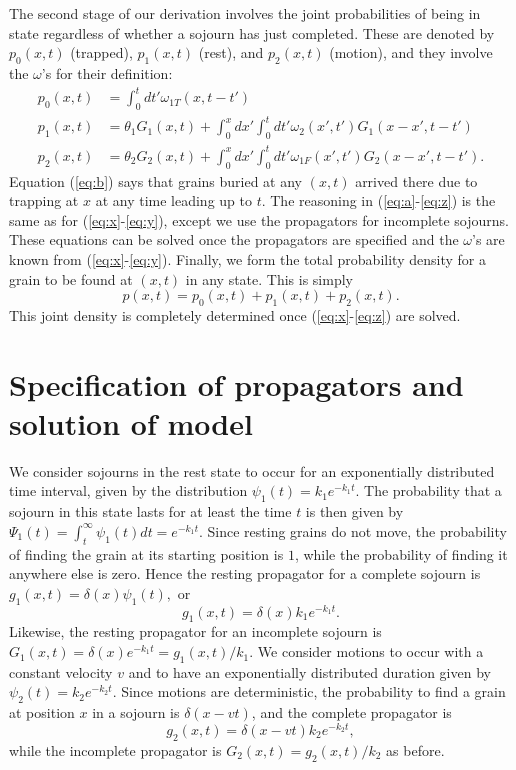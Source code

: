 \documentclass[]{agujournal2018}
\newcommand\be{\begin{equation}}
\newcommand\ee{\end{equation}}
\begin{document}
The second stage of our derivation involves the joint probabilities of being in state regardless of whether a sojourn has just completed. These are denoted by  $p_0(x,t)$ (trapped), $p_1(x,t)$ (rest), and $p_2(x,t)$ (motion), and they involve the $\omega$'s for their definition:
\begin{align}
p_0(x,t) &= \int_0^t dt' \omega_{1T}(x,t-t') \label{eq:b}\\
p_1(x,t) &= \theta_1 G_1(x,t) + \int_0^x dx' \int_0^t dt' \omega_2(x',t')G_1(x-x',t-t')\label{eq:a}\\
p_2(x,t) &= \theta_2 G_2(x,t) + \int_0^x dx' \int_0^t dt'  \omega_{1F}(x',t')G_2(x-x',t-t').\label{eq:z}
\end{align}
Equation (\ref{eq:b}) says that grains buried at any $(x,t)$ arrived there due to trapping at $x$ at any time leading up to $t$.
The reasoning in (\ref{eq:a}-\ref{eq:z}) is the same as for (\ref{eq:x}-\ref{eq:y}), except we use the propagators for incomplete sojourns.
These equations can be solved once the propagators are specified and the $\omega$'s are known from (\ref{eq:x}-\ref{eq:y}).
Finally, we form the total probability density for a grain to be found at $(x,t)$ in any state.
This is simply 
\be p(x,t) = p_0(x,t) + p_1(x,t) + p_2(x,t). \label{eq:dist}\ee
This joint density is completely determined once (\ref{eq:x}-\ref{eq:z}) are solved.


\section{Specification of propagators and solution of model}
\label{sec:solution}
We consider sojourns in the rest state to occur for an exponentially distributed time interval, given by the distribution $\psi_1(t) = k_1 e^{-k_1t}.$
The probability that a sojourn in this state lasts for at least the time $t$ is then given by $\Psi_1(t) = \int_t^\infty \psi_1(t)dt = e^{-k_1 t}$.
Since resting grains do not move, the probability of finding the grain at its starting position is $1$, while the probability of finding it anywhere else is zero.
Hence the resting propagator for a complete sojourn is $g_1(x,t) = \delta(x)\psi_1(t),$ or 
\be g_1(x,t) = \delta(x)k_1e^{-k_1t}.\label{eq:prop1} \ee
Likewise, the resting propagator for an incomplete sojourn is $G_1(x,t) = \delta(x)e^{-k_1t} = g_1(x,t)/k_1.$
We consider motions to occur with a constant velocity $v$ and to have an exponentially distributed duration given by $\psi_2(t) = k_2 e^{-k_2t}.$
Since motions are deterministic, the probability to find a grain at position $x$ in a sojourn is $\delta(x-vt)$, and the complete propagator is 
\be g_2(x,t) = \delta(x-vt)k_2e^{-k_2t},\label{eq:prop2}\ee
while the incomplete propagator is $G_2(x,t) = g_2(x,t)/k_2$ as before.
\end{document}
